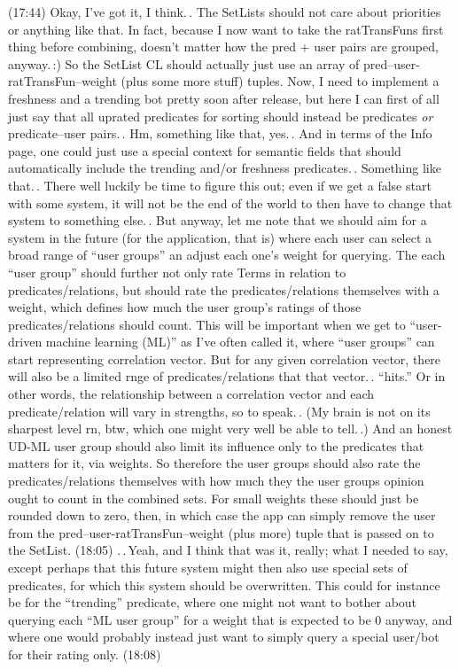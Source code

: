 \documentclass{report}
\begin{document}
(17:44) Okay, I've got it, I think.\,. The SetLists should not care about priorities or anything like that. In fact, because I now want to take the ratTransFuns first thing before combining, doesn't matter how the pred + user pairs are grouped, anyway.\,:) So the SetList CL should actually just use an array of pred--user-ratTransFun--weight (plus some more stuff) tuples. Now, I need to implement a freshness and a trending bot pretty soon after release, but here I can first of all just say that all uprated predicates for sorting should instead be predicates \emph{or} predicate--user pairs.\,. Hm, something like that, yes.\,. And in terms of the Info page, one could just use a special context for semantic fields that should automatically include the trending and/or freshness predicates.\,. Something like that.\,. There well luckily be time to figure this out; even if we get a false start with some system, it will not be the end of the world to then have to change that system to something else.\,. But anyway, let me note that we should aim for a system in the future (for the application, that is) where each user can select a broad range of ``user groups'' an adjust each one's weight for querying. The each ``user group'' should further not only rate Terms in relation to predicates/relations, but should rate the predicates/relations themselves with a weight, which defines how much the user group's ratings of those predicates/relations should count. This will be important when we get to ``user-driven machine learning (ML)'' as I've often called it, where ``user groups'' can start representing correlation vector. But for any given correlation vector, there will also be a limited rnge of predicates/relations that that vector.\,. ``hits.'' Or in other words, the relationship between a correlation vector and each predicate/relation will vary in strengths, so to speak.\,. (My brain is not on its sharpest level rn, btw, which one might very well be able to tell.\,.) And an honest UD-ML user group should also limit its influence only to the predicates that matters for it, via weights. So therefore the user groups should also rate the predicates/relations themselves with how much they the user groups opinion ought to count in the combined sets. For small weights these should just be rounded down to zero, then, in which case the app can simply remove the user from the pred--user-ratTransFun--weight (plus more) tuple that is passed on to the SetList. (18:05) .\,.\,Yeah, and I think that was it, really; what I needed to say, except perhaps that this future system might then also use special sets of predicates, for which this system should be overwritten. This could for instance be for the ``trending'' predicate, where one might not want to bother about querying each ``ML user group'' for a weight that is expected to be 0 anyway, and where one would probably instead just want to simply query a special user/bot for their rating only. (18:08) %
\end{document}
